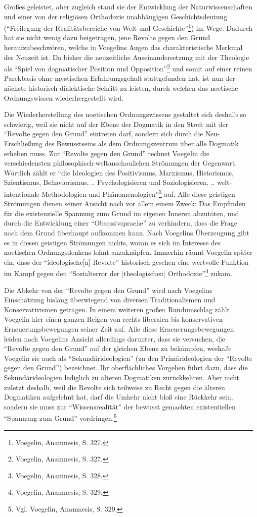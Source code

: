Großes geleistet, aber zugleich stand sie der Entwicklung der
Naturwissenschaften und einer von der religiösen Orthodoxie unabhängigen
Geschichtsdeutung ("`Freilegung der Realitätsbereiche von Welt und
Geschichte"'\footnote{Voegelin, Anamnesis, S. 327.}) im Wege. Dadurch hat sie
nicht wenig dazu beigetragen, jene Revolte gegen den Grund heraufzubeschwören,
welche in Voegelins Augen das charakteristische Merkmal der Neuzeit ist. Da
bisher die neuzeitliche Auseinandersetzung mit der Theologie als "`Spiel von
dogmatischer Position und Opposition"'\footnote{Voegelin, Anamnesis, S. 327.}
und somit auf einer reinen Parekbasis ohne mystischen Erfahrungsgehalt
stattgefunden hat, ist nun der nächste historisch-dialektische Schritt zu
leisten, durch welchen das noetische Ordnungswissen wiederhergestellt wird.

Die Wiederherstellung des noetischen Ordnungswissens gestaltet sich
deshalb so schwierig, weil sie nicht auf der Ebene der Dogmatik in den
Streit mit der "`Revolte gegen den Grund"' eintreten darf, sondern sich
durch die Neu-Erschließung des Bewusstseins als dem Ordnungszentrum über
alle Dogmatik erheben muss. Zur "`Revolte gegen den Grund"' rechnet
Voegelin die verschiedensten philosophisch-weltanschaulichen Strömungen
der Gegenwart. Wörtlich zählt er "`die Ideologien des Positivismus,
Marxismus, Historismus, Szientismus, Behaviorismus, ..  Psychologisieren
und Soziologisieren, .. welt-intentionale Methodologien und
Phänomenologien"'\footnote{Voegelin, Anamnesis, S. 328.} auf.  Alle diese
geistigen Strömungen dienen seiner Ansicht nach vor allem einem Zweck:
Das Empfinden für die existenzielle Spannung zum Grund im eigenen
Inneren abzutöten, und durch die Entwicklung einer "`Obsessivsprache"'
zu verhindern, dass die Frage nach dem Grund überhaupt aufkommen kann.
Nach Voegelins Überzeugung gibt es in diesen geistigen Strömungen
nichts, woran es sich im Interesse des noetischen Ordnungsdenkens lohnt
anzuknüpfen. Immerhin räumt Voegelin später ein, dass der
"`ideologische[n] Revolte"' historisch gesehen eine wertvolle Funktion
im Kampf gegen den "`Sozialterror der [theologischen]
Orthodoxie"'\footnote{Voegelin, Anamnesis, S. 329.} zukam.

Die Abkehr von der "`Revolte gegen den Grund"' wird nach Voegelins
Einschätzung bislang überwiegend von diversen Traditionalismen und
Konservativismen getragen. In einem weiteren großen Rundumschlag zählt
Voegelin hier einen ganzen Reigen von rechts-liberalen bis konservativen
Erneuerungsbewegungen seiner Zeit auf. Alle diese Erneuerungsbewegungen leiden
nach Voegelins Ansicht allerdings darunter, dass sie versuchen, die "`Revolte
gegen den Grund"' auf der gleichen Ebene zu bekämpfen, weshalb Voegelin sie
auch als "`Sekundärideologien"' (zu den Primärideologien der "`Revolte gegen
den Grund"') bezeichnet. Ihr oberflächliches Vorgehen führt dazu, dass die
Sekundärideologien lediglich zu älteren Dogmatiken zurückkehren. Aber nicht
zuletzt deshalb, weil die Revolte sich teilweise zu Recht gegen die älteren
Dogmatiken aufgelehnt hat, darf die Umkehr nicht bloß eine Rückkehr sein,
sondern sie muss zur "`Wissensrealität"' der bewusst gemachten existentiellen
"`Spannung zum Grund"' vordringen.\footnote{Vgl. Voegelin, Anamnesis, S. 329.}

